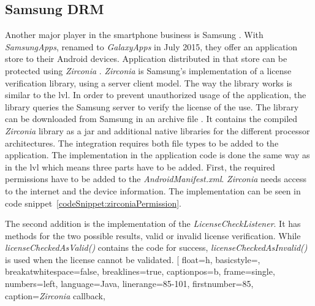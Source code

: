 \subsection{Samsung DRM} \label{section:license-samsung}
Another major player in the smartphone business is Samsung \cite{comscoreMarket}.
With \textit{SamsungApps}, renamed to \textit{GalaxyApps} in July 2015, they offer an application store to their Android devices.
Application distributed in that store can be protected using \textit{Zirconia} \cite{samsungZirconia}.
\textit{Zirconia} is Samsung’s implementation of a license verification library, using a server client model.
\newline
The way the library works is similar to the \gls{lvl}.
In order to prevent unauthorized usage of the application, the library queries the Samsung server to verify the license of the use.
The library can be downloaded from Samsung in an archive file \cite{samsungZirconia}.
It contains the compiled \textit{Zirconia} library as a \gls{jar} and additional native libraries for the different processor architectures.
The integration requires both file types to be added to the application.
The implementation in the application code is done the same way as in the \gls{lvl} which means three parts have to be added.
\newline
First, the required permissions have to be added to the \textit{AndroidManifest.xml}.
\textit{Zirconia} needs access to the internet and the device information.
The implementation can be seen in code snippet~\ref{codeSnippet:zirconiaPermission}.
\newline

The second addition is the implementation of the \textit{LicenseCheckListener}.
It has methods for the two possible results, valid or invalid license verification.
While \textit{licenseCheckedAsValid()} contains the code for success, \textit{licenseCheckedAsInvalid()} is used when the license cannot be validated.
\newline
[
  float=h,
  basicstyle=\footnotesize,
  breakatwhitespace=false,
  breaklines=true,
  captionpos=b,
  frame=single,
  numbers=left,
  language=Java,
  linerange={85-101},
  firstnumber=85,
  caption={\textit{Zirconia} callback},
